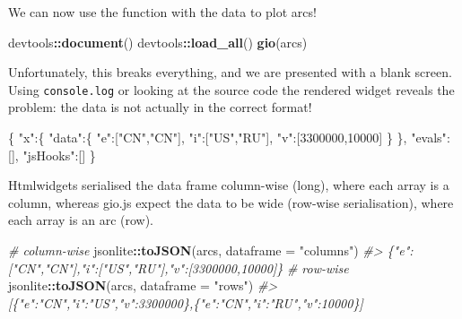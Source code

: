\documentclass[10pt,]{krantz}
\makeatletter
\newenvironment{Shaded}{\begin{snugshade}}{\end{snugshade}}
\newcommand{\CommentTok}[1]{\textcolor[rgb]{0.37,0.37,0.37}{\textit{#1}}}
\newcommand{\DataTypeTok}[1]{\textcolor[rgb]{0.27,0.27,0.27}{#1}}
\newcommand{\DecValTok}[1]{\textcolor[rgb]{0.06,0.06,0.06}{#1}}
\newcommand{\FunctionTok}[1]{\textcolor[rgb]{0,0,0}{#1}}
\newcommand{\KeywordTok}[1]{\textcolor[rgb]{0.27,0.27,0.27}{\textbf{#1}}}
\newcommand{\NormalTok}[1]{#1}
\newcommand{\OperatorTok}[1]{\textcolor[rgb]{0.43,0.43,0.43}{\textbf{#1}}}
\newcommand{\OtherTok}[1]{\textcolor[rgb]{0.37,0.37,0.37}{#1}}
\newcommand{\StringTok}[1]{\textcolor[rgb]{0.5,0.5,0.5}{#1}}
\newenvironment{kframe}{%
\medskip{}
\setlength{\fboxsep}{.8em}
 \def\at@end@of@kframe{}%
 \ifinner\ifhmode%
  \def\at@end@of@kframe{\end{minipage}}%
  \begin{minipage}{\columnwidth}%
 \fi\fi%
 \def\FrameCommand##1{\hskip\@totalleftmargin \hskip-\fboxsep
 \colorbox{shadecolor}{##1}\hskip-\fboxsep
     \hskip-\linewidth \hskip-\@totalleftmargin \hskip\columnwidth}%
 \MakeFramed {\advance\hsize-\width
   \@totalleftmargin\z@ \linewidth\hsize
   \@setminipage}}%
 {\par\unskip\endMakeFramed%
 \at@end@of@kframe}
\renewenvironment{Shaded}{\begin{kframe}}{\end{kframe}}
\makeatother
\begin{document}
We can now use the function with the data to plot arcs!

\begin{Shaded}
\begin{Highlighting}[]
\NormalTok{devtools}\OperatorTok{::}\KeywordTok{document}\NormalTok{()}
\NormalTok{devtools}\OperatorTok{::}\KeywordTok{load_all}\NormalTok{()}
\KeywordTok{gio}\NormalTok{(arcs)}
\end{Highlighting}
\end{Shaded}

Unfortunately, this breaks everything, and we are presented with a blank screen. Using \texttt{console.log} or looking at the source code the rendered widget reveals the problem: the data is not actually in the correct format!

\begin{Shaded}
\begin{Highlighting}[]
\FunctionTok{\{}
  \DataTypeTok{"x"}\FunctionTok{:\{}
    \DataTypeTok{"data"}\FunctionTok{:\{}
      \DataTypeTok{"e"}\FunctionTok{:}\OtherTok{[}\StringTok{"CN"}\OtherTok{,}\StringTok{"CN"}\OtherTok{]}\FunctionTok{,}
      \DataTypeTok{"i"}\FunctionTok{:}\OtherTok{[}\StringTok{"US"}\OtherTok{,}\StringTok{"RU"}\OtherTok{]}\FunctionTok{,}
      \DataTypeTok{"v"}\FunctionTok{:}\OtherTok{[}\DecValTok{3300000}\OtherTok{,}\DecValTok{10000}\OtherTok{]}
    \FunctionTok{\}}
  \FunctionTok{\},}
  \DataTypeTok{"evals"}\FunctionTok{:}\OtherTok{[]}\FunctionTok{,}
  \DataTypeTok{"jsHooks"}\FunctionTok{:}\OtherTok{[]}
\FunctionTok{\}}
\end{Highlighting}
\end{Shaded}

Htmlwidgets serialised the data frame column-wise (long), where each array is a column, whereas gio.js expect the data to be wide (row-wise serialisation), where each array is an arc (row).

\begin{Shaded}
\begin{Highlighting}[]
\CommentTok{# column-wise}
\NormalTok{jsonlite}\OperatorTok{::}\KeywordTok{toJSON}\NormalTok{(arcs, }\DataTypeTok{dataframe =} \StringTok{"columns"}\NormalTok{)}
\CommentTok{#> \{"e":["CN","CN"],"i":["US","RU"],"v":[3300000,10000]\}}
\CommentTok{# row-wise}
\NormalTok{jsonlite}\OperatorTok{::}\KeywordTok{toJSON}\NormalTok{(arcs, }\DataTypeTok{dataframe =} \StringTok{"rows"}\NormalTok{)}
\CommentTok{#> [\{"e":"CN","i":"US","v":3300000\},\{"e":"CN","i":"RU","v":10000\}]}
\end{Highlighting}
\end{Shaded}
\end{document}
